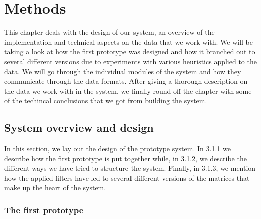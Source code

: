 \chapter{Methods\label{Methods}}

This chapter deals with the design of our system, an overview of the
implementation and technical aspects on the data that we work with. We
will be taking a look at how the first prototype was designed and how
it branched out to several different versions due to experiments with
various heuristics applied to the data. We will go through the
individual modules of the system and how they communicate through the
data formats. After giving a thorough description on the data we work
with in the system, we finally round off the chapter with some of the
techincal conclusions that we got from building the system.

\section{System overview and design\label{SystemOverviewAndDesign}}

In this section, we lay out the design of the prototype system. In
3.1.1 we describe how the first prototype is put together while, in
3.1.2, we describe the different ways we have tried to structure the
system. Finally, in 3.1.3, we mention how the applied filters have led
to several different versions of the matrices that make up the heart
of the system.

\subsection{The first prototype}

